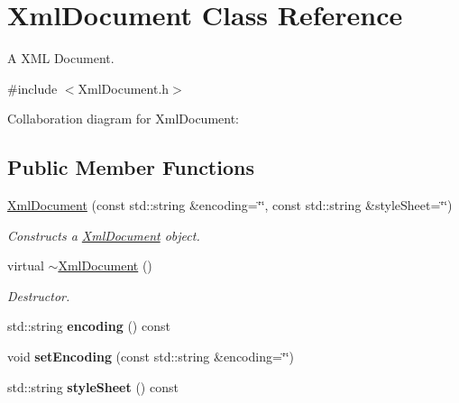 \hypertarget{class_xml_document}{\section{Xml\+Document Class Reference}
\label{class_xml_document}
}


A X\+M\+L Document.  




{\ttfamily \#include $<$Xml\+Document.\+h$>$}



Collaboration diagram for Xml\+Document\+:
\subsection*{Public Member Functions}
\begin{DoxyCompactItemize}
\item 
\hyperlink{class_xml_document_a2d485f23564b1e4382963db545fcac38}{Xml\+Document} (const std\+::string \&encoding=\char`\"{}\char`\"{}, const std\+::string \&style\+Sheet=\char`\"{}\char`\"{})
\begin{DoxyCompactList}\small\item\em Constructs a \hyperlink{class_xml_document}{Xml\+Document} object. \end{DoxyCompactList}\item 
\hypertarget{class_xml_document_ab18742228f580a5e4ec87e4b39c8a68c}{virtual \hyperlink{class_xml_document_ab18742228f580a5e4ec87e4b39c8a68c}{$\sim$\+Xml\+Document} ()}\label{class_xml_document_ab18742228f580a5e4ec87e4b39c8a68c}

\begin{DoxyCompactList}\small\item\em Destructor. \end{DoxyCompactList}\item 
\hypertarget{class_xml_document_a5063b9dc310ed5ed7a38b77f8584a50c}{std\+::string {\bfseries encoding} () const }\label{class_xml_document_a5063b9dc310ed5ed7a38b77f8584a50c}

\item 
\hypertarget{class_xml_document_afb4401e77f67626533ba7409a011c508}{void {\bfseries set\+Encoding} (const std\+::string \&encoding=\char`\"{}\char`\"{})}\label{class_xml_document_afb4401e77f67626533ba7409a011c508}

\item 
\hypertarget{class_xml_document_ae0a7e5e1f28b179c31bee66481b18c03}{std\+::string {\bfseries style\+Sheet} () const }\label{class_xml_document_ae0a7e5e1f28b179c31bee66481b18c03}


\end{DoxyCompactItemize}

